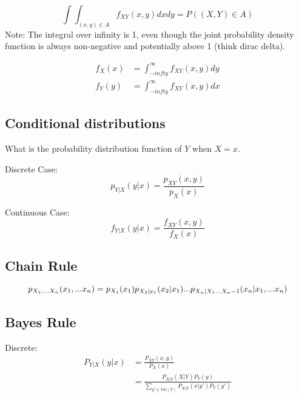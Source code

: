 \documentclass{article}
\begin{document}
    \begin{equation}
        \int \int_{(x,y) \in A} {f_{XY}(x,y)dxdy = P((X,Y) \in A)}
    \end{equation}
    Note: The integral over infinity is 1, even though the joint probability density function is always non-negative and potentially above 1 (think dirac delta).

    \begin{align}
        f_X(x) & = \int_{-infty}^{\infty}f_{XY}(x,y)dy \\
        f_Y(y) & = \int_{-infty}^{\infty}f_{XY}(x,y)dx
    \end{align}
        
    \subsection{Conditional distributions}
    What is the probability distribution function of $Y$ when $X=x$.
    \setlength{\parskip}{6pt}

    Discrete Case:
    \begin{equation}
        p_{Y|X}(y|x) = \frac{p_{XY}(x,y)}{p_X(x)}
    \end{equation}
    \setlength{\parskip}{6pt}
    
    Continuous Case:
    \begin{equation}
        f_{Y|X}(y|x)=\frac{f_{XY}(x,y)}{f_X(x)}
    \end{equation} 

    \subsection{Chain Rule}
    \begin{equation}
        p_{X_1,...X_n}(x_1,...x_n) \\ 
        = p_{X_1}(x_1)p_{X_2|x_1}(x_2 | x_1)...p_{X_n|X_1...X_n-1}(x_n|x_1,...x_n)
    \end{equation}

    \subsection{Bayes Rule}
    Discrete:
    \begin{align}
        P_{Y|X}(y|x) & = \frac{P_{XY}(x,y)}{P_X(x)} \\
        & = \frac{P_{X|Y}(X|Y)P_Y(y)}{\sum_{y\prime \in Val(Y)}P_{X|Y}(x|y\prime)P_Y(y\prime)}
    \end{align}
\end{document}
